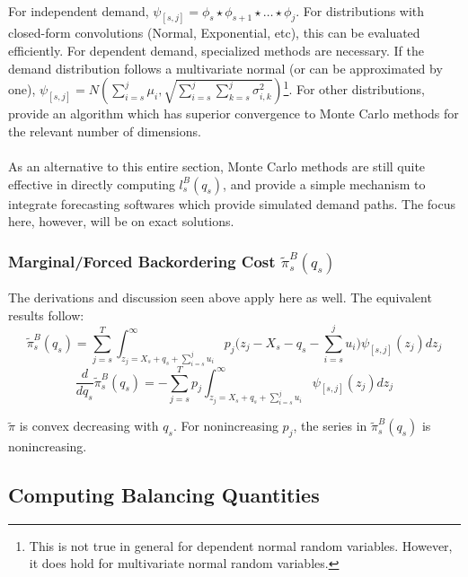 \documentclass[12pt]{article}
\begin{document}
\\
For independent demand, $\psi_{[s,j]} = \phi_s \star \phi_{s+1} \star \dots \star \phi_j$.
For distributions with closed-form convolutions (Normal, Exponential, etc), this can be evaluated efficiently. For dependent demand, specialized methods are necessary. If the demand distribution follows a multivariate normal (or can be approximated by one), $\psi_{[s,j]} = N(\sum_{i=s}^j \mu_i, \sqrt{\sum_{i=s}^{j} \sum_{k=s}^j \sigma_{i,k}^2})$\footnote{This is not true in general for dependent normal random variables. However, it does hold for multivariate normal random variables.}. For other distributions,  \cite{arbenz:2011} provide an algorithm which has superior convergence to Monte Carlo methods for the relevant number of dimensions.\\
\\ 
As an alternative to this entire section, Monte Carlo methods are still quite effective in directly computing $l_s^B(q_s)$, and provide a simple mechanism to integrate forecasting softwares which provide simulated demand paths. The focus here, however, will be on exact solutions. 

\subsubsection*{Marginal/Forced Backordering Cost $\tilde{\pi}_s^B(q_s)$}

The derivations and discussion seen above apply here as well. The equivalent results follow:
\begin{equation}
	\tilde{\pi}_s^B(q_s) =  \sum_{j=s}^T \int_{z_j= X_s + q_s + \sum_{i=s}^j u_i }^{\infty} p_j\bigg( z_j - X_s - q_s - \sum_{i=s}^j u_i \bigg)  \psi_{[s,j]}(z_j) dz_j
\end{equation}
\begin{equation}
	\frac{d}{d q_s} \tilde{\pi}_s^B(q_s) = - \sum_{j=s}^T p_j \int_{z_j=X_s + q_s + \sum_{i=s}^j u_i }^{\infty}  \psi_{[s,j]}(z_j) dz_j 
\end{equation}

$\tilde{\pi}$ is convex decreasing with $q_s$. For nonincreasing $p_j$, the series in $\tilde{\pi}_s^B(q_s)$ is nonincreasing. 

\subsection{Computing Balancing Quantities}
\end{document}

